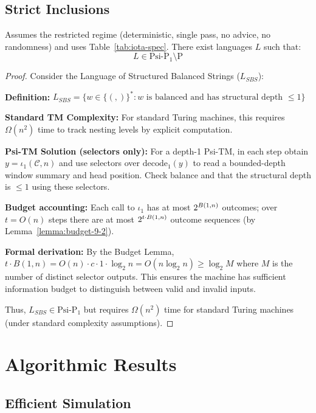 \subsection{Strict Inclusions}

\begin{theorem}
Assumes the restricted regime (deterministic, single pass, no advice, no randomness) and uses Table~\ref{tab:iota-spec}.
There exist languages $L$ such that:
$$L \in \text{Psi-P}_1 \setminus \text{P}$$
\end{theorem}

\begin{proof}
Consider the Language of Structured Balanced Strings ($L_{SBS}$):

\textbf{Definition:} $L_{SBS} = \{w \in \{(,)\}^* : w \text{ is balanced and has structural depth } \leq 1\}$

\textbf{Standard TM Complexity:}
For standard Turing machines, this requires $\Omega(n^2)$ time to track nesting levels by explicit computation.

\textbf{Psi-TM Solution (selectors only):}
For a depth-1 Psi-TM, in each step obtain $y=\iota_1(\mathcal{C},n)$ and use selectors over $\mathrm{decode}_1(y)$ to read a bounded-depth window summary and head position. Check balance and that the structural depth is $\le 1$ using these selectors.

\textbf{Budget accounting:}
Each call to $\iota_1$ has at most $2^{\B(1,n)}$ outcomes; over $t=O(n)$ steps there are at most $2^{t\cdot\B(1,n)}$ outcome sequences (by Lemma~\ref{lemma:budget-9-2}).

\textbf{Formal derivation:} By the Budget Lemma, $t \cdot B\!(1,n) = O(n) \cdot c \cdot 1 \cdot \log_{2} n = O(n \log_{2} n) \ge \log_{2} M$ where $M$ is the number of distinct selector outputs. This ensures the machine has sufficient information budget to distinguish between valid and invalid inputs.

Thus, $L_{SBS} \in \text{Psi-P}_1$ but requires $\Omega(n^2)$ time for standard Turing machines (under standard complexity assumptions).
\end{proof}

\section{Algorithmic Results}

\subsection{Efficient Simulation}

